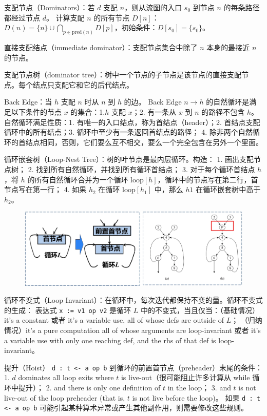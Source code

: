 \par \noindent 支配节点（Dominators）：若 $d$ 支配 $n$，则从流图的入口 $s_0$ 到节点 $n$ 的每条路径都经过节点 $d$。
计算支配 $n$ 的所有节点 $D[n]$：$D(n) = \{n\} \cup \bigcap_{p \in \text{pred}(n)} D[p]$，初始条件：$D[s_0] = \{s_0\}$。
\par \noindent 直接支配结点（immediate dominator）：支配节点集合中除了 $n$ 本身的最接近 $n$ 的节点。
\par \noindent 支配节点树（dominator tree）：树中一个节点的子节点是该节点的直接支配节点。每个结点只支配它和它的后代结点。

\par \noindent Back Edge：当 $h$ 支配 $n$ 时从 $n$ 到 $h$ 的边。
Back Edge $n \rightarrow h$ 的自然循环是满足以下条件的节点 $x$ 的集合：1.$h$ 支配 $x$；2. 有一条从 $x$ 到 $n$ 的路径不包含 $h$。
自然循环满足性质：1. 有唯一的入口结点，称为首结点（header）；2. 首结点支配循环中的所有结点；3. 循环中至少有一条返回首结点的路径；
4. 除非两个自然循环的首结点相同，否则，它们要么互不相交，要么一个完全包含在另外一个里面。
\par \noindent 循环嵌套树（Loop-Nest Tree）：树的叶节点是最内层循环。构造：
1. 画出支配节点树；
2. 找到所有自然循环，并找到所有循环首结点；
3. 对于每个循环首结点 $h$，将 $h$ 的所有自然循环合并为一个循环 $\text{loop}[h]$，循环中的节点写在第二行，首节点写在第一行；
4. 如果 $h_2$ 在循环 $\text{loop}[h_1]$ 中，那么 $h1$ 在循环嵌套树中高于 $h_2$。

\begin{figure}[H]
    \centering
    \includegraphics[width=0.8\linewidth]{figures/loop1.png}
\end{figure}

\par \noindent 循环不变式（Loop Invariant）：在循环中，每次迭代都保持不变的量。循环不变式的生成：
表达式 \texttt{x := v1 op v2} 是循环 $L$ 中的不变式，当且仅当：（基础情况）it’s a constant 或者 
it’s a variable use, all of whose defs are outside of $L$；
（归纳情况）it’s a pure computation all of whose arguments are loop-invariant 或者
it’s a variable use with only one reaching def, and the rhs of that def is loop-invariant。

\par \noindent 提升（Hoist） \texttt{d : t <- a op b} 到循环的前置首节点（preheader）末尾的条件：
1. $d$ dominates all loop exits where $t$ is live-out（很可能阻止许多计算从 while 循环中提升）；
2. and there is only one definition of $t$ in the loop；
3. and $t$ is not live-out of the loop preheader (that is, $t$ is not live before the loop)。
如果 \texttt{d : t <- a op b} 可能引起某种算术异常或产生其他副作用，则需要修改这些规则。